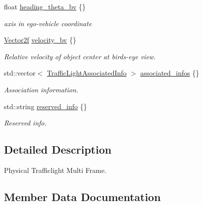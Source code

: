 \begin{DoxyCompactItemize}
float \hyperlink{structmaf__perception__interface_1_1PhysicalTrafficLightMultiFrame_a450a87f797443d20d7ab302146ee9c6a}{heading\+\_\+theta\+\_\+bv} \{\}
\begin{DoxyCompactList}\small\item\em axis in ego-\/vehicle coordinate \end{DoxyCompactList}\item 
\hyperlink{structmaf__perception__interface_1_1Vector2f}{Vector2f} \hyperlink{structmaf__perception__interface_1_1PhysicalTrafficLightMultiFrame_a5116dde2c546840a156dad468fd17970}{velocity\+\_\+bv} \{\}
\begin{DoxyCompactList}\small\item\em Relative velocity of object center at bird\textquotesingle{}s-\/eye view. \end{DoxyCompactList}\item 
std\+::vector$<$ \hyperlink{structmaf__perception__interface_1_1TrafficLightAssociatedInfo}{Traffic\+Light\+Associated\+Info} $>$ \hyperlink{structmaf__perception__interface_1_1PhysicalTrafficLightMultiFrame_a365f2d1626b4f919d5ce4df2ca540047}{associated\+\_\+infos} \{\}
\begin{DoxyCompactList}\small\item\em Association information. \end{DoxyCompactList}\item 
std\+::string \hyperlink{structmaf__perception__interface_1_1PhysicalTrafficLightMultiFrame_ae6872ecd114ec0ab5e027e1466352c07}{reserved\+\_\+info} \{\}
\begin{DoxyCompactList}\small\item\em Reserved info. \end{DoxyCompactList}\end{DoxyCompactItemize}


\subsection{Detailed Description}
Physical Trafficlight Multi Frame. 

\subsection{Member Data Documentation}
\mbox{\label{structmaf__perception__interface_1_1PhysicalTrafficLightMultiFrame_a365f2d1626b4f919d5ce4df2ca540047}} 

